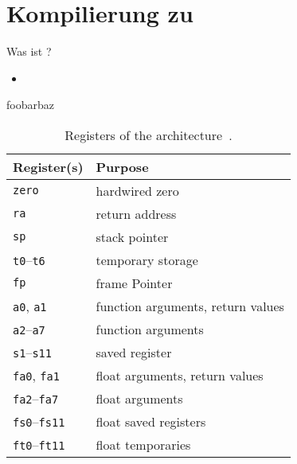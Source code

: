 \section{Kompilierung zu \riscv}
\begin{frame}{Was ist \riscv?}
	\begin{itemize}
        \item {}
	\end{itemize}
\end{frame}

\begin{frame}{foobarbaz}
	\begin{table}
		\centering
		\caption[Registers of the \riscv{} architecture.]{Registers of the \riscv{} architecture~\cite[p.~155]{Waterman2019}.}\label{tbl:riscv_regs}
		\begin{tabularx}{\linewidth}{l|L}
			 Register(s) & Purpose                           \\ \hline
			\texttt{zero}                  & hardwired zero                    \\ \hline
			\texttt{ra}                    & return address                    \\ \hline
			\texttt{sp}                    & stack pointer                     \\ \hline
			\texttt{t0}--\texttt{t6}       & temporary storage                 \\ \hline
			\texttt{fp}                    & frame Pointer                     \\ \hline
			\texttt{a0}, \texttt{a1}       & function arguments, return values \\ \hline
			\texttt{a2}--\texttt{a7}       & function arguments                \\ \hline
			\texttt{s1}--\texttt{s11}      & saved register                    \\ \hline
			\texttt{fa0}, \texttt{fa1}     & float arguments, return values    \\ \hline
			\texttt{fa2}--\texttt{fa7}     & float arguments                   \\ \hline
			\texttt{fs0}--\texttt{fs11}    & float saved registers             \\ \hline
			\texttt{ft0}--\texttt{ft11}    & float temporaries                 \\
		\end{tabularx}
	\end{table}
\end{frame}

